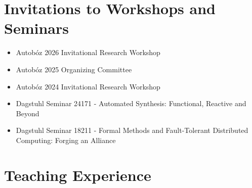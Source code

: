 \documentclass[11pt,a4paper,sans]{moderncv}        %
\begin{document}
\section{Invitations to Workshops and Seminars}

\begin{itemize}
	\setlength\itemsep{2pt}
	\item Autobóz 2026 Invitational Research Workshop
	\item Autobóz 2025 Organizing Committee
	\item Autobóz 2024 Invitational Research Workshop
	\item Dagstuhl Seminar 24171 - Automated Synthesis: Functional, Reactive and Beyond
	\item Dagstuhl Seminar 18211 -  Formal Methods and Fault-Tolerant Distributed Computing: Forging an Alliance	
\end{itemize}



\section{Teaching Experience}
\end{document}

